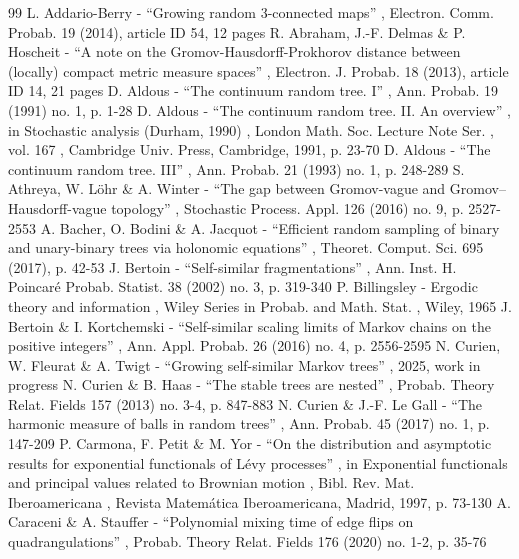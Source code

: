 \documentclass[11pt]{article}
\theoremstyle{definition}
\begin{document}

\begin{thebibliography}{99}
 L. Addario-Berry - “Growing random 3-connected maps” , Electron. Comm. Probab. 19 (2014), article ID 54, 12 pages
 R. Abraham, J.-F. Delmas \& P. Hoscheit - “A note on the Gromov-Hausdorff-Prokhorov distance between (locally) compact metric measure spaces” , Electron. J. Probab. 18 (2013), article ID 14, 21 pages
 D. Aldous - “The continuum random tree. I” , Ann. Probab. 19 (1991) no. 1, p. 1-28
 D. Aldous - “The continuum random tree. II. An overview” , in Stochastic analysis (Durham, 1990) , London Math. Soc. Lecture Note Ser. , vol. 167 , Cambridge Univ. Press, Cambridge, 1991, p. 23-70
 D. Aldous - “The continuum random tree. III” , Ann. Probab. 21 (1993) no. 1, p. 248-289
 S. Athreya, W. Löhr \& A. Winter - “The gap between Gromov-vague and Gromov–Hausdorff-vague topology” , Stochastic Process. Appl. 126 (2016) no. 9, p. 2527-2553
 A. Bacher, O. Bodini \& A. Jacquot - “Efficient random sampling of binary and unary-binary trees via holonomic equations” , Theoret. Comput. Sci. 695 (2017), p. 42-53
 J. Bertoin - “Self-similar fragmentations” , Ann. Inst. H. Poincaré Probab. Statist. 38 (2002) no. 3, p. 319-340
 P. Billingsley - Ergodic theory and information , Wiley Series in Probab. and Math. Stat. , Wiley, 1965
 J. Bertoin \& I. Kortchemski - “Self-similar scaling limits of Markov chains on the positive integers” , Ann. Appl. Probab. 26 (2016) no. 4, p. 2556-2595
 N. Curien, W. Fleurat \& A. Twigt - “Growing self-similar Markov trees” , 2025, work in progress
 N. Curien \& B. Haas - “The stable trees are nested” , Probab. Theory Relat. Fields 157 (2013) no. 3-4, p. 847-883
 N. Curien \& J.-F. Le Gall - “The harmonic measure of balls in random trees” , Ann. Probab. 45 (2017) no. 1, p. 147-209
 P. Carmona, F. Petit \& M. Yor - “On the distribution and asymptotic results for exponential functionals of Lévy processes” , in Exponential functionals and principal values related to Brownian motion , Bibl. Rev. Mat. Iberoamericana , Revista Matemática Iberoamericana, Madrid, 1997, p. 73-130
 A. Caraceni \& A. Stauffer - “Polynomial mixing time of edge flips on quadrangulations” , Probab. Theory Relat. Fields 176 (2020) no. 1-2, p. 35-76

\end{thebibliography}
\end{document}
